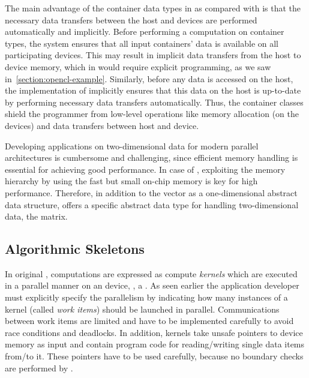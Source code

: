 The main advantage of the container data types in \SkelCL as compared with \OpenCL is that the necessary data transfers between the host and devices are performed automatically and implicitly.
Before performing a computation on container types, the \SkelCL system ensures that all input containers' data is available on all participating devices.
This may result in implicit data transfers from the host to device memory, which in \OpenCL would require explicit programming, as we saw in~\autoref{section:opencl-example}.
Similarly, before any data is accessed on the host, the implementation of \SkelCL implicitly ensures that this data on the host is up-to-date by performing necessary data transfers automatically.
Thus, the container classes shield the programmer from low-level operations like memory allocation (on the devices) and data transfers between host and device.

Developing applications on two-dimensional data for modern parallel architectures is cumbersome and challenging, since efficient memory handling is essential for achieving good performance.
In case of \GPUs, exploiting the memory hierarchy by using the fast but small on-chip memory is key for high performance.
Therefore, in addition to the vector as a one-dimensional abstract data structure, \SkelCL offers a specific abstract data type for handling two-dimensional data, the matrix.



\subsection{Algorithmic Skeletons}
\label{section:skelcl-programming-model:skeletons}
In original \OpenCL, computations are expressed as compute \emph{kernels} which are executed in a parallel manner on an \OpenCL device, \eg, a \GPU.
As seen earlier the application developer must explicitly specify the parallelism by indicating how many instances of a kernel (called \emph{work items}) should be launched in parallel.
Communications between work items are limited and have to be implemented carefully to avoid race conditions and deadlocks.
In addition, kernels take unsafe pointers to device memory as input and contain program code for reading/writing single data items from/to it.
These pointers have to be used carefully, because no boundary checks are performed by \OpenCL.

